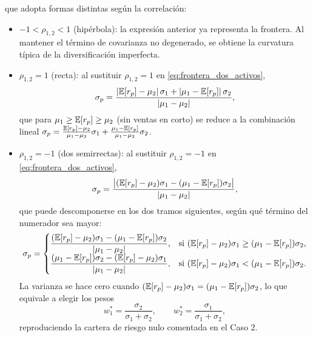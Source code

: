 que adopta formas distintas según la correlación:
\begin{itemize}
  \item $-1 < \rho_{1,2} < 1$ (hipérbola): la expresión anterior ya representa la frontera. Al mantener el término de covarianza no degenerado, se obtiene la curvatura típica de la diversificación imperfecta.
  \item $\rho_{1,2} = 1$ (recta): al sustituir $\rho_{1,2}=1$ en \eqref{eq:frontera_dos_activos},
  \begin{equation*}
    \sigma_p = \frac{|\mathbb{E}[r_p]-\mu_2|\,\sigma_1 + |\mu_1-\mathbb{E}[r_p]|\,\sigma_2}{|\mu_1-\mu_2|},
  \end{equation*}
  que para $\mu_1 \geq \mathbb{E}[r_p] \geq \mu_2$ (sin ventas en corto) se reduce a la combinación lineal $\sigma_p = \frac{\mathbb{E}[r_p]-\mu_2}{\mu_1-\mu_2}\sigma_1 + \frac{\mu_1-\mathbb{E}[r_p]}{\mu_1-\mu_2}\sigma_2$.
  \item $\rho_{1,2} = -1$ (dos semirrectas): al sustituir $\rho_{1,2}=-1$ en \eqref{eq:frontera_dos_activos},
  \begin{equation*}
    \sigma_p = \frac{\big|(\mathbb{E}[r_p]-\mu_2)\sigma_1 - (\mu_1-\mathbb{E}[r_p])\sigma_2\big|}{|\mu_1-\mu_2|},
  \end{equation*}
  que puede descomponerse en los dos tramos siguientes, según qué término del numerador sea mayor:
  \begin{equation*}
    \sigma_p =
    \begin{cases}
      \dfrac{(\mathbb{E}[r_p]-\mu_2)\sigma_1 - (\mu_1-\mathbb{E}[r_p])\sigma_2}{|\mu_1-\mu_2|}, & \text{si } (\mathbb{E}[r_p]-\mu_2)\sigma_1 \geq (\mu_1-\mathbb{E}[r_p])\sigma_2, \\
      \dfrac{(\mu_1-\mathbb{E}[r_p])\sigma_2 - (\mathbb{E}[r_p]-\mu_2)\sigma_1}{|\mu_1-\mu_2|}, & \text{si } (\mathbb{E}[r_p]-\mu_2)\sigma_1 < (\mu_1-\mathbb{E}[r_p])\sigma_2.
    \end{cases}
  \end{equation*}
  La varianza se hace cero cuando $(\mathbb{E}[r_p]-\mu_2)\sigma_1 = (\mu_1-\mathbb{E}[r_p])\sigma_2$, lo que equivale a elegir los pesos
  \begin{equation*}
    w_1^* = \frac{\sigma_2}{\sigma_1+\sigma_2}, \qquad
    w_2^* = \frac{\sigma_1}{\sigma_1+\sigma_2},
  \end{equation*}
  reproduciendo la cartera de riesgo nulo comentada en el Caso 2.
\end{itemize}

